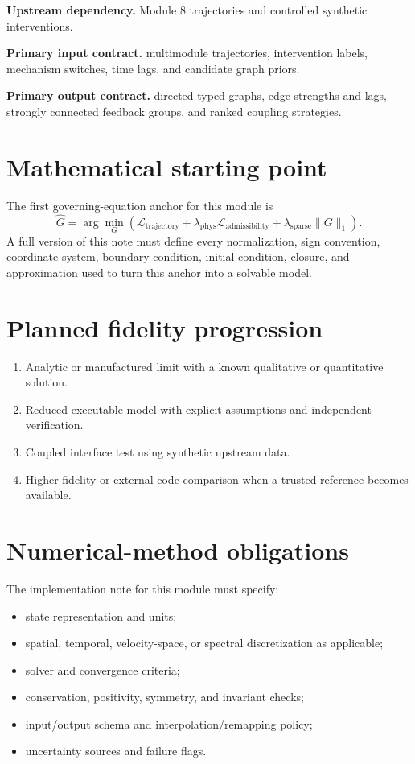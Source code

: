 \documentclass[11pt]{article}
\begin{document}
\textbf{Upstream dependency.} Module 8 trajectories and controlled synthetic interventions.

\textbf{Primary input contract.} multimodule trajectories, intervention labels, mechanism switches, time lags, and candidate graph priors.

\textbf{Primary output contract.} directed typed graphs, edge strengths and lags, strongly connected feedback groups, and ranked coupling strategies.

\section{Mathematical starting point}
The first governing-equation anchor for this module is
\begin{equation}
\widehat G=\arg\min_G\left(\mathcal L_{\mathrm{trajectory}}+\lambda_{\mathrm{phys}}\mathcal L_{\mathrm{admissibility}}+\lambda_{\mathrm{sparse}}\lVert G\rVert_1\right).
\end{equation}
A full version of this note must define every normalization, sign convention, coordinate system, boundary condition, initial condition, closure, and approximation used to turn this anchor into a solvable model.

\section{Planned fidelity progression}
\begin{enumerate}[leftmargin=1.6em]
\item Analytic or manufactured limit with a known qualitative or quantitative solution.
\item Reduced executable model with explicit assumptions and independent verification.
\item Coupled interface test using synthetic upstream data.
\item Higher-fidelity or external-code comparison when a trusted reference becomes available.
\end{enumerate}

\section{Numerical-method obligations}
The implementation note for this module must specify:
\begin{itemize}[leftmargin=1.6em]
\item state representation and units;
\item spatial, temporal, velocity-space, or spectral discretization as applicable;
\item solver and convergence criteria;
\item conservation, positivity, symmetry, and invariant checks;
\item input/output schema and interpolation/remapping policy;
\item uncertainty sources and failure flags.
\end{itemize}
\end{document}
